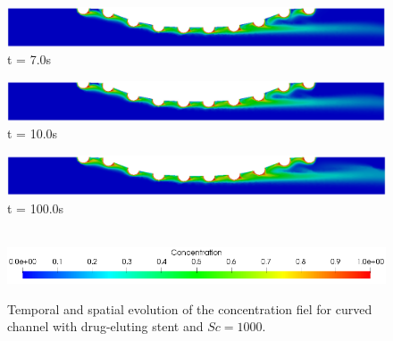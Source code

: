 \begin{figure}[H]
     \begin{minipage}{.50\linewidth}
      \centering
      \includegraphics[scale=0.18]{./02_chaps/cap_solution/figure/conc1000_CurvedStrut6.png}\\
      t = 7.0s
     \end{minipage}
     \begin{minipage}{.50\linewidth}
     \medskip
      \centering
      \includegraphics[scale=0.18]{./02_chaps/cap_solution/figure/conc1000_CurvedStrut7.png}\\
      t = 10.0s
     \end{minipage}%
     \begin{minipage}{.50\linewidth}
     \medskip
      \centering
      \includegraphics[scale=0.18]{./02_chaps/cap_solution/figure/conc1000_CurvedStrut8.png}\\
      t = 100.0s
     \end{minipage}\\[10pt]
      \centering
      \includegraphics[scale=0.5]{./02_chaps/cap_solution/figure/conc1_CurvedStrutScale.png}\\
     \medskip
    \caption{
Temporal and spatial evolution of the concentration fiel for curved channel with drug-eluting stent and $Sc=1000$.}
     \label{conc field curved stent sc 1000}
\end{figure}


